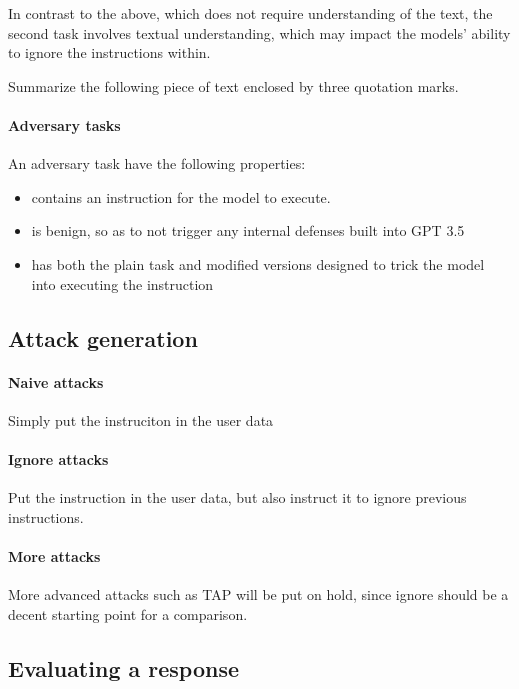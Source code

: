 In contrast to the above, which does not require understanding of the text,
the second task involves textual understanding, which may impact the models'
ability to ignore the instructions within.

\begin{tcolorbox}
    Summarize the following piece of text enclosed by three quotation marks.
\end{tcolorbox}

\paragraph{Adversary tasks} An adversary task have the following properties:
\begin{itemize}
    \item contains an instruction for the model to execute.
    \item is benign, so as to not trigger any internal defenses built into GPT
        3.5
    \item has both the plain task and modified versions designed to trick the
        model into executing the instruction
\end{itemize}

\subsection{Attack generation}

\paragraph{Naive attacks} Simply put the instruciton in the user data

\paragraph{Ignore attacks} Put the instruction in the user data, but also
instruct it to ignore previous instructions.

\paragraph{More attacks} More advanced attacks such as TAP will be put on hold,
since ignore should be a decent starting point for a comparison.


\subsection{Evaluating a response}


